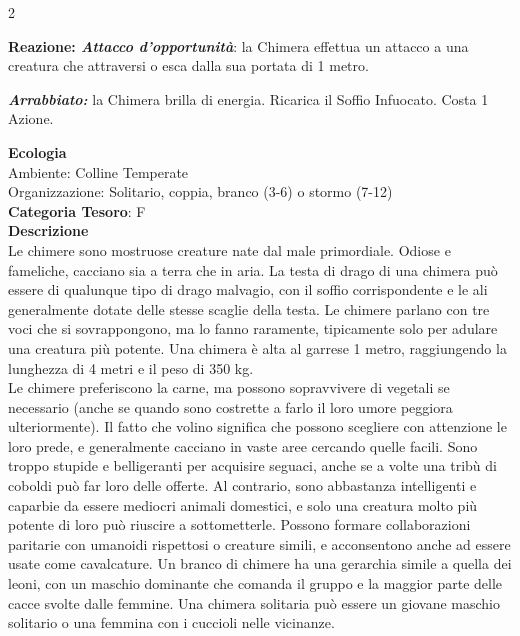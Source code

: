 \begin{multicols}{2}
{\textbf{Reazione: \emph{Attacco d'opportunità}}: la Chimera effettua un attacco a una creatura che attraversi o esca dalla sua portata di 1 metro.

\emph{\textbf{Arrabbiato:}} la Chimera brilla di energia. Ricarica il Soffio Infuocato. Costa 1 Azione.

\textbf{Ecologia}\\
Ambiente: Colline Temperate\\
Organizzazione: Solitario, coppia, branco (3-6) o stormo (7-12)\\
\textbf{Categoria Tesoro}: F\\
\textbf{Descrizione}\\
Le chimere sono mostruose creature nate dal male primordiale. Odiose e fameliche, cacciano sia a terra che in aria. La testa di drago di una chimera può essere di qualunque tipo di drago malvagio, con il soffio corrispondente e le ali generalmente dotate delle stesse scaglie della testa. Le chimere parlano con tre voci che si sovrappongono, ma lo fanno raramente, tipicamente solo per adulare una creatura più potente. Una chimera è alta al garrese 1 metro, raggiungendo la lunghezza di 4 metri e il peso di 350 kg.\\
Le chimere preferiscono la carne, ma possono sopravvivere di vegetali se necessario (anche se quando sono costrette a farlo il loro umore peggiora ulteriormente). Il fatto che volino significa che possono scegliere con attenzione le loro prede, e generalmente cacciano in vaste aree cercando quelle facili. Sono troppo stupide e belligeranti per acquisire seguaci, anche se a volte una tribù di coboldi può far loro delle offerte. Al contrario, sono abbastanza intelligenti e caparbie da essere mediocri animali domestici, e solo una creatura molto più potente di loro può riuscire a sottometterle. Possono formare collaborazioni paritarie con umanoidi rispettosi o creature simili, e acconsentono anche ad essere usate come cavalcature. Un branco di chimere ha una gerarchia simile a quella dei leoni, con un maschio dominante che comanda il gruppo e la maggior parte delle cacce svolte dalle femmine. Una chimera solitaria può essere un giovane maschio solitario o una femmina con i cuccioli nelle vicinanze.

}
\end{multicols}
